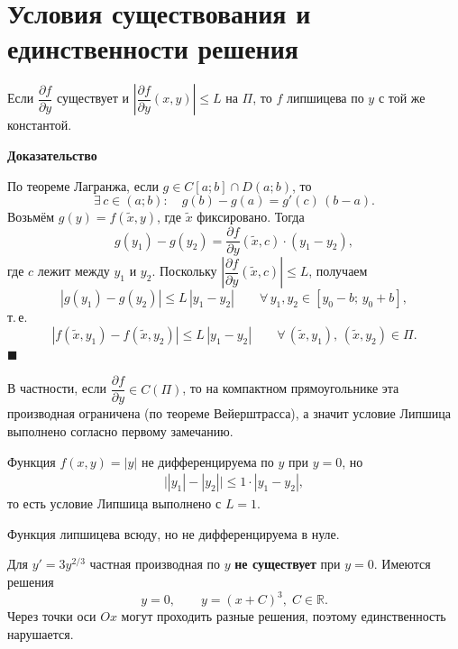 \documentclass[12pt,a4paper]{article}
\numberwithin{equation}{section}
\renewenvironment{proof}[1][Доказательство]{\begin{center}\textbf{#1}\end{center}}{\hfill$\blacksquare$\par}
\DeclareRobustCommand{\examtag}[1]{\space{\normalfont\small\color{HSEgray}(#1)}}
\begin{document}
\section{Условия существования и единственности решения\examtag{вопрос~4}}

\begin{remarkHSE}
Если $\dfrac{\partial f}{\partial y}$ существует и \(\left|\dfrac{\partial f}{\partial y}(x,y)\right|\le L\) на $\Pi$, то \(f\) липшицева по \(y\) с той же константой.
\begin{proof}
По теореме Лагранжа, если $g\in C[a;b]\cap D(a;b)$, то
\[
  \exists\, c\in(a;b)\colon\quad g(b)-g(a)=g'(c)\,(b-a).
\]
Возьмём $g(y)=f(\tilde x,y)$, где $\tilde x$ фиксировано. Тогда
\[
  g(y_1)-g(y_2)=\frac{\partial f}{\partial y}(\tilde x,c)\cdot(y_1-y_2),
\]
где $c$ лежит между $y_1$ и $y_2$. Поскольку
\(\left|\dfrac{\partial f}{\partial y}(\tilde x,c)\right|\le L\), получаем
\[
  |g(y_1)-g(y_2)|\le L\,|y_1-y_2|\qquad\forall\, y_1,y_2\in[y_0-b;\,y_0+b],
\]
т.\,е.
\[
  |f(\tilde x,y_1)-f(\tilde x,y_2)|\le L\,|y_1-y_2|\qquad\forall\,(\tilde x,y_1),\,(\tilde x,y_2)\in\Pi.
\]
\end{proof}
\end{remarkHSE}

\begin{remarkHSE}
В частности, если $\dfrac{\partial f}{\partial y}\in C(\Pi)$, то на компактном прямоугольнике эта производная ограничена (по теореме Вейерштрасса), а значит условие Липшица выполнено согласно первому замечанию.
\end{remarkHSE}

\begin{exampleHSE}
Функция \(f(x,y)=|y|\) не дифференцируема по $y$ при $y=0$, но
\begin{gather*}
\bigl||y_1|-|y_2|\bigr|\le1\cdot|y_1-y_2|,
\end{gather*}
то есть условие Липшица выполнено с $L=1$.

Функция липшицева всюду, но не дифференцируема в нуле.
\end{exampleHSE}

\begin{exampleHSE}
Для \(y'=3y^{2/3}\) частная производная по $y$ \textbf{не существует} при $y=0$. Имеются решения
\[
y=0,
\qquad
y=\left(x+C\right)^3,\;C\in\mathbb{R}.
\]
Через точки оси $Ox$ могут проходить разные решения, поэтому единственность нарушается.
\end{exampleHSE}
\end{document}
